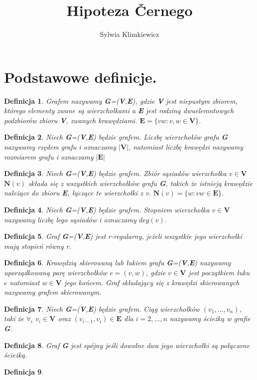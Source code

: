 \documentclass[12pt,a4paper]{article}
\newtheorem{df}{Definicja}[section]
\begin{document}
\title{Hipoteza \v Cernego}
\author{Sylwia Klimkiewicz}
\maketitle

\section{Podstawowe definicje.}
\begin{df} 
Grafem nazywamy \textbf{G}=(\textbf{V},\textbf{E}), gdzie \textbf{V} jest niepustym zbiorem, kt\'orego elementy zwane s\k{a} wierzcho{\l}kami a \textbf{E} jest rodzin\k{a} dwuelemntowych podzbior\'ow zbioru \textbf{V}, zwanych kraw\k{e}dziami.
$\textbf{E}=\{vw : v,w\in\textbf{V}\}$.
\end{df}
\begin{df} 
Niech \textbf{G}=(\textbf{V},\textbf{E}) b\k{e}dzie grafem. Liczb\k{e} wierzcho{\l}\'ow grafu \textbf{G} nazywamy rz\k{e}dem grafu i oznaczamy $|\textbf{V}|$, natomiast liczb\k{e} kraw\k{e}dzi nazywamy rozmiarem grafu i oznaczamy $|\textbf{E}|$
\end{df}
\begin{df} 
Niech \textbf{G}=(\textbf{V},\textbf{E}) b\k{e}dzie grafem. Zbi\'or s\k{a}siad\'ow wierzcho{\l}ka $v\in\textbf{V}$ $\textbf{N}(v)$ sk{\l}ada si\k{e} z wszystkich wierzcho{\l}k\'ow grafu \textbf{G}, takich \.ze istniej\k{a} kraw\k{e}dzie nale\.z\k{a}ce do zbioru \textbf{E}, {\l}\k{a}cz\k{a}ce te wierzcho{\l}ki z v. $\textbf{N}(v)=\{w : vw\in\textbf{E}\}$.
\end{df} 
\begin{df} 
Niech \textbf{G}=(\textbf{V},\textbf{E}) b\k{e}dzie grafem. Stopniem wierzcho{\l}ka $v\in\textbf{V}$ nazywamy liczb\k{e} lego s\k{a}siad\'ow i oznaczamy $deg(v)$.
\end{df}
\begin{df} 
Graf \textbf{G}=(\textbf{V},\textbf{E}) jest r-regularny, je\.zeli wszystkie jego wierzcho{\l}ki maj\k{a} stopie\'n r\'owny r.
\end{df} 
\begin{df} 
Kraw\k{e}dzi\k{a} skierowan\k{a} lub {\l}ukiem grafu \textbf{G}=(\textbf{V},\textbf{E}) nazywamy uporz\k{a}dkowan\k{a} par\k{e} wierzcho{\l}k\'ow $e=(v,w)$, gdzie $v\in\textbf{V}$ jest pocz\k{a}tkiem {\l}uku $e$ natomiast $w\in\textbf{V}$ jego ko\'ncem. Graf sk{\l}adaj\k{a}cy si\k{e} z kraw\k{e}dzi skierowanych nazywamy grafem skierowanym.
\end{df}

\begin{df} 
Niech \textbf{G}=(\textbf{V},\textbf{E}) b\k{e}dzie grafem. Ci\k{a}g wierzcho{\l}k\'ow $(v_{1},\ldots,v_{n})$, taki \.ze $\forall_{i}$ $v_{i}\in\textbf{V}$ oraz  $(v_{i-1},v_{i})\in\textbf{E}$ dla $i=2,\ldots,n$ nazywamy \'scie\.zk\k{a} w grafie \textbf{G}.
\end{df} 
\begin{df} 
Graf \textbf{G} jest sp\'ojny je\'sli dowolne dwa jego wierzcho{\l}ki s\k{a} po{\l}\k{a}czone \'scie\.zk\k{a}.
\end{df}

\begin{df}
\end{df}
\end{document}
